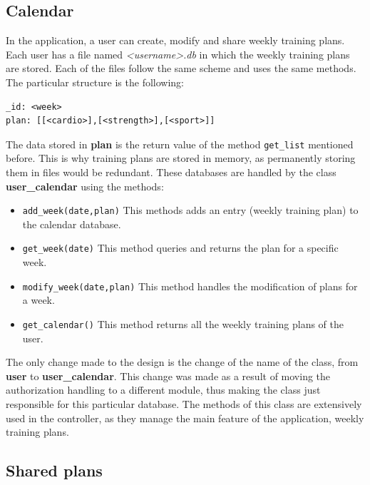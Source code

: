\documentclass[12pt,twoside,titlepage,a4paper]{article}
\theoremstyle{definicion}
\theoremstyle{lema}
\theoremstyle{teorema}
\theoremstyle{corolario}
\theoremstyle{ejemplo}
\theoremstyle{nota}
\begin{document}
\subsection{Calendar} \label{calendar}

In the application, a user can create, modify and share weekly training plans. Each user has a file named \textit{<username>.db} in 
which the weekly training plans are stored. Each of the files follow the same scheme and uses the same methods. The particular 
structure is the following:
\begin{lstlisting}
_id: <week>
plan: [[<cardio>],[<strength>],[<sport>]]
\end{lstlisting}
The data stored in \textbf{plan} is the return value of the method \texttt{get\_list} mentioned before. This is why training plans are
stored in memory, as permanently storing them in files would be redundant. These databases are handled by the class \textbf{user\_calendar}
using the methods:
\begin{itemize} [noitemsep]
	\item \texttt{add\_week(date,plan)} This methods adds an entry (weekly training plan) to the calendar database.
	\item \texttt{get\_week(date)} This method queries and returns the plan for a specific week.
	\item \texttt{modify\_week(date,plan)} This method handles the modification of plans for a week.
	\item \texttt{get\_calendar()} This method returns all the weekly training plans of the user.
\end{itemize}
The only change made to the design is the change of the name of the class, from \textbf{user} to \textbf{user\_calendar}. This change was
made as a result of moving the authorization handling to a different module, thus making the class just responsible for this particular
database. The methods of this class are extensively used in the controller, as they manage the main feature of the application, weekly
training plans.

\subsection{Shared plans}
\end{document}
